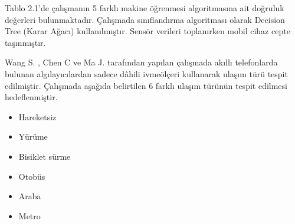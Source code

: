 Tablo 2.1'de çalışmanın 5 farklı makine öğrenmesi algoritmasına ait doğruluk değerleri bulunmaktadır. Çalışmada sınıflandırma algoritması olarak Decision Tree (Karar Ağacı) kullanılmıştır. Sensör verileri toplanırken mobil cihaz cepte taşınmıştır. 
\newpage






Wang S. , Chen C  ve Ma J. tarafından yapılan çalışmada \cite{wang2010accelerometer} akıllı telefonlarda bulunan algılayıcılardan sadece dâhili ivmeölçeri kullanarak ulaşım türü tespit edilmiştir. Çalışmada aşağıda belirtilen 6 farklı ulaşım türünün tespit edilmesi hedeflenmiştir.\begin{itemize}
  \item Hareketsiz
  \item Yürüme
  \item Bisiklet sürme
  \item Otobüs
  \item Araba
  \item Metro
\end{itemize}

